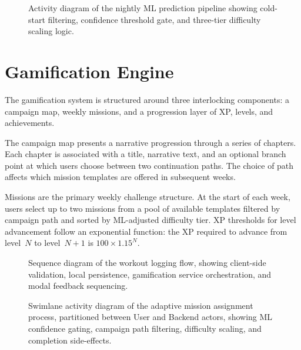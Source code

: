 \documentclass[12pt, a4paper]{report}
\begin{document}
\begin{figure}[H]
  \centering
  \caption{Activity diagram of the nightly ML prediction pipeline showing cold-start filtering, confidence threshold gate, and three-tier difficulty scaling logic.}
  \label{fig:activity-ml}
\end{figure}

\section{Gamification Engine}

The gamification system is structured around three interlocking components: a campaign map, weekly missions, and a progression layer of XP, levels, and achievements.

The campaign map presents a narrative progression through a series of chapters. Each chapter is associated with a title, narrative text, and an optional branch point at which users choose between two continuation paths. The choice of path affects which mission templates are offered in subsequent weeks.

Missions are the primary weekly challenge structure. At the start of each week, users select up to two missions from a pool of available templates filtered by campaign path and sorted by ML-adjusted difficulty tier. XP thresholds for level advancement follow an exponential function: the XP required to advance from level~$N$ to level~$N+1$ is $100 \times 1.15^{N}$.

\begin{figure}[H]
  \centering
  \caption{Sequence diagram of the workout logging flow, showing client-side validation, local persistence, gamification service orchestration, and modal feedback sequencing.}
  \label{fig:seq-workout}
\end{figure}

\begin{figure}[H]
  \centering
  \caption{Swimlane activity diagram of the adaptive mission assignment process, partitioned between User and Backend actors, showing ML confidence gating, campaign path filtering, difficulty scaling, and completion side-effects.}
  \label{fig:activity-missions}
\end{figure}
\end{document}
